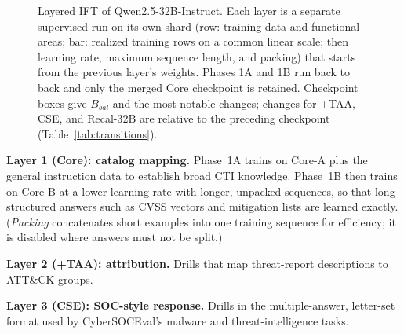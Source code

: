 \documentclass[conference]{IEEEtran}
\begin{document}
\begin{figure}[t]
\caption{Layered IFT of Qwen2.5-32B-Instruct. Each layer is a separate supervised run on its own shard (row: training data and functional areas; bar: realized training rows on a common linear scale; then learning rate, maximum sequence length, and packing) that starts from the previous layer's weights. Phases 1A and 1B run back to back and only the merged Core checkpoint is retained. Checkpoint boxes give $B_{bal}$ and the most notable changes; changes for +TAA, CSE, and Recal-32B are relative to the preceding checkpoint (Table~\ref{tab:transitions}).}
\label{fig:layered}
\end{figure}

\textbf{Layer 1 (Core): catalog mapping.} Phase~1A trains on Core-A plus the general instruction data to establish broad CTI knowledge. Phase~1B then trains on Core-B at a lower learning rate with longer, unpacked sequences, so that long structured answers such as CVSS vectors and mitigation lists are learned exactly. (\emph{Packing} concatenates short examples into one training sequence for efficiency; it is disabled where answers must not be split.)

\textbf{Layer 2 (+TAA): attribution.} Drills that map threat-report descriptions to ATT\&CK groups.

\textbf{Layer 3 (CSE): SOC-style response.} Drills in the multiple-answer, letter-set format used by CyberSOCEval's malware and threat-intelligence tasks.
\end{document}
